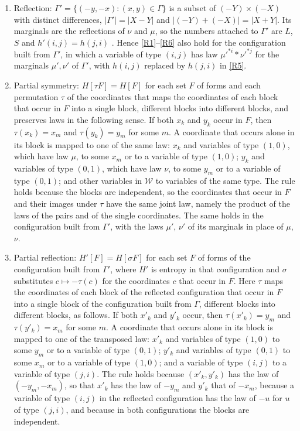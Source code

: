 \documentclass[11pt]{amsart}
\theoremstyle{definition}
\theoremstyle{remark}
\numberwithin{equation}{section}
\begin{document}
\begin{enumerate}[label=(R\arabic*),resume]
\item\label{R7} Reflection: $\Gamma'=\{(-y,-x):(x,y)\in\Gamma\}$ is a subset of $(-Y)\times(-X)$ with distinct differences, $|\Gamma'|=|X-Y|$ and $|(-Y)+(-X)|=|X+Y|$. Its marginals are the reflections of $\nu$ and $\mu$, so the numbers attached to $\Gamma'$ are $L$, $S$ and $h'(i,j)=h(j,i)$ \cite[proof of Corollary~5.3]{Kle26}. Hence \ref{R1}--\ref{R6} also hold for the configuration built from $\Gamma'$, in which a variable of type $(i,j)$ has law $\mu'^{*i}*\nu'^{*j}$ for the marginals $\mu',\nu'$ of $\Gamma'$, with $h(i,j)$ replaced by $h(j,i)$ in \ref{R5}.
\item\label{R9} Partial symmetry: $H[\tau F]=H[F]$ for each set $F$ of forms and each permutation $\tau$ of the coordinates that maps the coordinates of each block that occur in $F$ into a single block, different blocks into different blocks, and preserves laws in the following sense. If both $x_k$ and $y_k$ occur in $F$, then $\tau(x_k)=x_m$ and $\tau(y_k)=y_m$ for some $m$. A coordinate that occurs alone in its block is mapped to one of the same law: $x_k$ and variables of type $(1,0)$, which have law $\mu$, to some $x_m$ or to a variable of type $(1,0)$; $y_k$ and variables of type $(0,1)$, which have law $\nu$, to some $y_m$ or to a variable of type $(0,1)$; and other variables in $\mathcal W$ to variables of the same type. The rule holds because the blocks are independent, so the coordinates that occur in $F$ and their images under $\tau$ have the same joint law, namely the product of the laws of the pairs and of the single coordinates. The same holds in the configuration built from $\Gamma'$, with the laws $\mu'$, $\nu'$ of its marginals in place of $\mu$, $\nu$.
\item\label{R10} Partial reflection: $H'[F]=H[\sigma F]$ for each set $F$ of forms of the configuration built from $\Gamma'$, where $H'$ is entropy in that configuration and $\sigma$ substitutes $c\mapsto-\tau(c)$ for the coordinates $c$ that occur in $F$. Here $\tau$ maps the coordinates of each block of the reflected configuration that occur in $F$ into a single block of the configuration built from $\Gamma$, different blocks into different blocks, as follows. If both $x'_k$ and $y'_k$ occur, then $\tau(x'_k)=y_m$ and $\tau(y'_k)=x_m$ for some $m$. A coordinate that occurs alone in its block is mapped to one of the transposed law: $x'_k$ and variables of type $(1,0)$ to some $y_m$ or to a variable of type $(0,1)$; $y'_k$ and variables of type $(0,1)$ to some $x_m$ or to a variable of type $(1,0)$; and a variable of type $(i,j)$ to a variable of type $(j,i)$. The rule holds because $(x'_k,y'_k)$ has the law of $(-y_m,-x_m)$, so that $x'_k$ has the law of $-y_m$ and $y'_k$ that of $-x_m$, because a variable of type $(i,j)$ in the reflected configuration has the law of $-u$ for $u$ of type $(j,i)$, and because in both configurations the blocks are independent.\end{enumerate}
\end{document}
